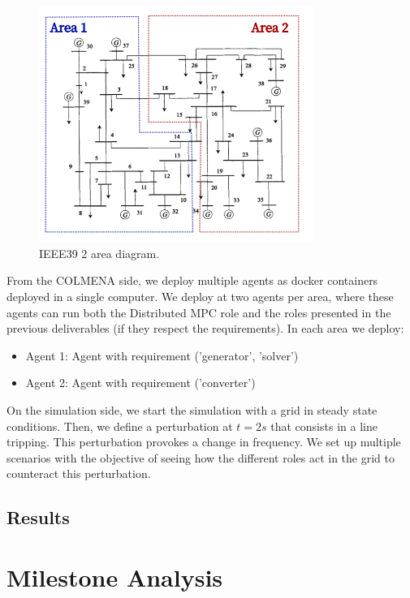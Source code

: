 \documentclass{article}
\begin{document}
\begin{figure}[ht]
    \centering
    \includegraphics[width=0.8\textwidth]{figures/ieee2areas.png}
    \caption{IEEE39 2 area diagram.}
    \label{fig:ieee39_2areas}
\end{figure}

From the COLMENA side, we deploy multiple agents as docker containers deployed in a single computer. We deploy at two agents per area, where these agents can run both the Distributed MPC role and the roles presented in the previous deliverables (if they respect the requirements). In each area we deploy:

\begin{itemize}
    \item Agent 1: Agent with requirement ('generator', 'solver') 
    \item Agent 2: Agent with requirement ('converter') 
\end{itemize}

On the simulation side, we start the simulation with a grid in steady state conditions. Then, we define a perturbation at $t=2s$ that consists in a line tripping. This perturbation provokes a change in frequency. We set up multiple scenarios with the objective of seeing how the different roles act in the grid to counteract this perturbation.

\subsection{Results}

\section{Milestone Analysis}
\end{document}
